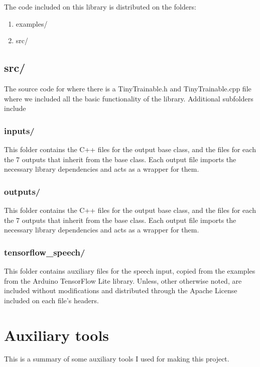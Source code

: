 The code included on this library is distributed on the folders:

\begin{enumerate}
  \item examples/
  \item src/
\end{enumerate}

\subsection{src/}

The source code for where there is a TinyTrainable.h and TinyTrainable.cpp file where we included all the basic functionality of the library. Additional subfolders include

\subsubsection{inputs/}

This folder contains the C++ files for the output base class, and the files for each the 7 outputs that inherit from the base class. Each output file imports the necessary library dependencies and acts as a wrapper for them.
\subsubsection{outputs/}

This folder contains the C++ files for the output base class, and the files for each the 7 outputs that inherit from the base class. Each output file imports the necessary library dependencies and acts as a wrapper for them.

\subsubsection{tensorflow{\_}speech/}

This folder contains auxiliary files for the speech input, copied from the examples from the Arduino TensorFlow Lite library. Unless, other otherwise noted, are included without modifications and distributed through the Apache License included on each file's headers.

\section{Auxiliary tools}

This is a summary of some auxiliary tools I used for making this project.

